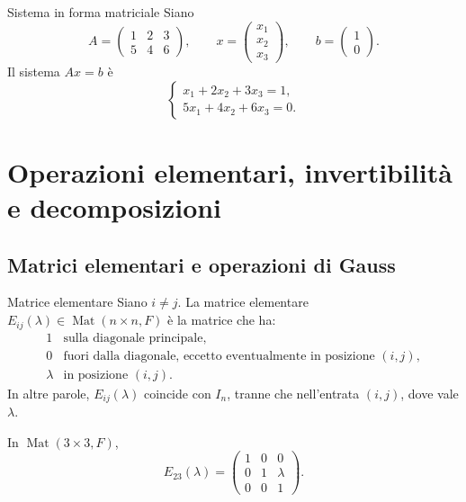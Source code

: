 \documentclass[a4paper]{article}
\begin{document}
\begin{snippetexample}{Sistema in forma matriciale}
    Siano
    \[
        A=
        \begin{pmatrix}
            1 & 2 & 3\\
            5 & 4 & 6
        \end{pmatrix},
        \qquad
        x=
        \begin{pmatrix}
            x_1\\
            x_2\\
            x_3
        \end{pmatrix},
        \qquad
        b=
        \begin{pmatrix}
            1\\
            0
        \end{pmatrix}.
    \]
    Il sistema \(Ax=b\) è
    \[
        \begin{cases}
            x_1+2x_2+3x_3=1,\\
            5x_1+4x_2+6x_3=0.
        \end{cases}
    \]
\end{snippetexample}

\section{Operazioni elementari, invertibilità e decomposizioni}

\subsection{Matrici elementari e operazioni di Gauss}

\begin{snippetdefinition}{Matrice elementare}
    Siano \(i\neq j\). La matrice elementare \(E_{ij}(\lambda)\in\operatorname{Mat}(n\times n,F)\) è la matrice che ha:
    \[
        \begin{array}{ll}
            1 & \text{sulla diagonale principale},\\
            0 & \text{fuori dalla diagonale, eccetto eventualmente in posizione }(i,j),\\
            \lambda & \text{in posizione }(i,j).
        \end{array}
    \]
    In altre parole, \(E_{ij}(\lambda)\) coincide con \(I_n\), tranne che nell'entrata \((i,j)\), dove vale \(\lambda\).
\end{snippetdefinition}

\begin{snippetexample}{}
    In \(\operatorname{Mat}(3\times 3,F)\),
    \[
        E_{23}(\lambda)
        =
        \begin{pmatrix}
            1 & 0 & 0\\
            0 & 1 & \lambda\\
            0 & 0 & 1
        \end{pmatrix}.
    \]
\end{snippetexample}
\end{document}
